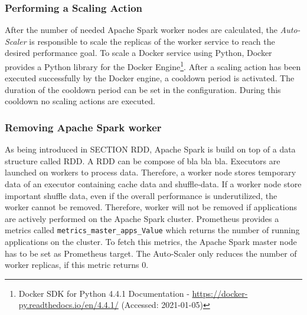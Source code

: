 \subsubsection{Performing a Scaling Action}
After the number of needed Apache Spark worker nodes are calculated, the \textit{Auto-Scaler} is responsible to scale the replicas of the worker service to reach the desired performance goal.
To scale a Docker service using Python, Docker provides a Python library for the Docker Engine\footnote{Docker SDK for Python 4.4.1 Documentation - \url{https://docker-py.readthedocs.io/en/4.4.1/} (Accessed: 2021-01-05)}. 
After a scaling action has been executed successfully by the Docker engine, a cooldown period is activated. The duration of the cooldown period can be set in the configuration. During this cooldown no scaling actions are executed.


\subsubsection{Removing Apache Spark worker}
As being introduced in SECTION RDD, Apache Spark is build on top of a data structure called RDD. A RDD can be compose of bla bla bla.
Executors are launched on workers to process data. Therefore, a worker node stores temporary data of an executor containing cache data and shuffle-data.
If a worker node store important shuffle data, even if the overall performance is underutilized, the worker cannot be removed.
Therefore, worker will not be removed if applications are actively performed on the Apache Spark cluster.
Prometheus provides a metrics called \texttt{metrics\_master\_apps\_Value} which returns the number of running applications on the cluster. To fetch this metrics, the Apache Spark master node has to be set as Prometheus target.
The Auto-Scaler only reduces the number of worker replicas, if this metric returns 0.


